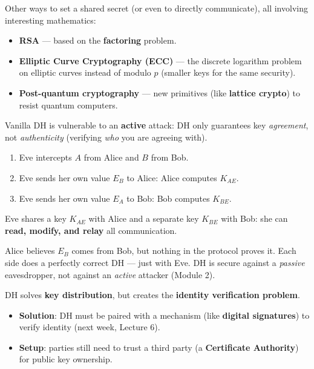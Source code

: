 \begin{rembox}[title=Beyond DH]
Other ways to set a shared secret (or even to directly communicate), all involving
interesting mathematics:
\begin{itemize}
  \item \textbf{RSA} --- based on the \textbf{factoring} problem.
  \item \textbf{Elliptic Curve Cryptography (ECC)} --- the discrete logarithm problem on
        elliptic curves instead of modulo $p$ (smaller keys for the same security).
  \item \textbf{Post-quantum cryptography} --- new primitives (like \textbf{lattice
        crypto}) to resist quantum computers.
\end{itemize}
\end{rembox}

\begin{defnbox}[title=Man-In-The-Middle (MITM) attack]
Vanilla DH is vulnerable to an \textbf{active} attack: DH only guarantees key
\emph{agreement}, not \emph{authenticity} (verifying \emph{who} you are agreeing with).
\begin{enumerate}
  \item Eve intercepts $A$ from Alice and $B$ from Bob.
  \item Eve sends her own value $E_B$ to Alice: Alice computes $K_{AE}$.
  \item Eve sends her own value $E_A$ to Bob: Bob computes $K_{BE}$.
\end{enumerate}
Eve shares a key $K_{AE}$ with Alice and a separate key $K_{BE}$ with Bob: she can
\textbf{read, modify, and relay} all communication.
\end{defnbox}

\begin{rembox}[title=Why it works]
Alice believes $E_B$ comes from Bob, but nothing in the protocol proves it. Each side
does a perfectly correct DH --- just with Eve. DH is secure against a \emph{passive}
eavesdropper, not against an \emph{active} attacker (Module 2).
\end{rembox}

\begin{defnbox}[title=Identity verification problem]
DH solves \textbf{key distribution}, but creates the \textbf{identity verification
problem}.
\begin{itemize}
  \item \textbf{Solution}: DH must be paired with a mechanism (like \textbf{digital
        signatures}) to verify identity (next week, Lecture 6).
  \item \textbf{Setup}: parties still need to trust a third party (a
        \textbf{Certificate Authority}) for public key ownership.
\end{itemize}
\end{defnbox}

